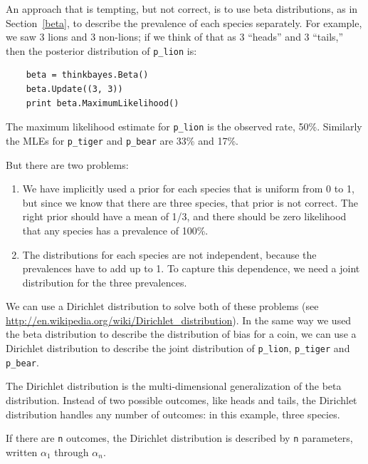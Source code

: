 \documentclass[12pt]{book}
\begin{document}
An approach that is tempting, but not correct, is to use beta
distributions, as in Section~\ref{beta}, to describe the prevalence of
each species separately.  For example, we saw 3 lions and 3 non-lions;
if we think of that as 3 ``heads'' and 3 ``tails,'' then the posterior
distribution of \verb"p_lion" is:

\begin{verbatim}
    beta = thinkbayes.Beta()
    beta.Update((3, 3))
    print beta.MaximumLikelihood()
\end{verbatim}

The maximum likelihood estimate for \verb"p_lion" is the observed
rate, 50\%.  Similarly the MLEs for \verb"p_tiger" and \verb"p_bear"
are 33\% and 17\%.

But there are two problems:

\begin{enumerate}

\item We have implicitly used a prior for each species that is uniform
  from 0 to 1, but since we know that there are three species, that
  prior is not correct.  The right prior should have a mean of 1/3,
  and there should be zero likelihood that any species has a
  prevalence of 100\%.

\item The distributions for each species are not independent, because
  the prevalences have to add up to 1.  To capture this dependence, we
  need a joint distribution for the three prevalences.

\end{enumerate}

We can use a Dirichlet distribution to solve both of these problems
(see \url{http://en.wikipedia.org/wiki/Dirichlet_distribution}).  In
the same way we used the beta distribution to describe the
distribution of bias for a coin, we can use a Dirichlet
distribution to describe the joint distribution of \verb"p_lion",
\verb"p_tiger" and \verb"p_bear".

The Dirichlet distribution is the multi-dimensional generalization
of the beta distribution.  Instead of two possible outcomes, like
heads and tails, the Dirichlet distribution handles any number of
outcomes: in this example, three species.

If there are {\tt n} outcomes, the Dirichlet distribution is
described by {\tt n} parameters, written $\alpha_1$ through $\alpha_n$.
\end{document}
